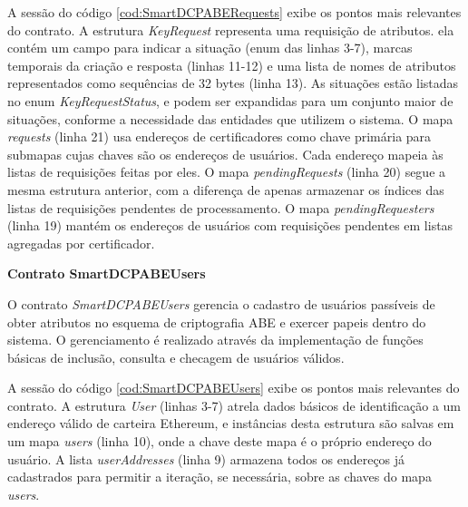 \documentclass[a4paper,11pt]{article}
\begin{document}

A sessão do código \ref{cod:SmartDCPABERequests} exibe os pontos mais relevantes do contrato.
A estrutura \emph{KeyRequest} representa uma requisição de atributos. ela contém um campo para indicar a situação (enum das linhas 3-7), marcas temporais da criação e resposta (linhas 11-12) e uma lista de nomes de atributos representados como sequências de 32 bytes (linha 13).
As situações estão listadas no enum \emph{KeyRequestStatus}, e podem ser expandidas para um conjunto maior de situações, conforme a necessidade das entidades que utilizem o sistema.
O mapa \emph{requests} (linha 21) usa endereços de certificadores como chave primária para submapas cujas chaves são os endereços de usuários. Cada endereço mapeia às listas de requisições feitas por eles.
O mapa \emph{pendingRequests} (linha 20) segue a mesma estrutura anterior, com a diferença de apenas armazenar os índices das listas de requisições pendentes de processamento.
O mapa \emph{pendingRequesters} (linha 19) mantém os endereços de usuários com requisições pendentes em listas agregadas por certificador. %

\textbf{Contrato SmartDCPABEUsers}



O contrato \emph{SmartDCPABEUsers} gerencia o cadastro de usuários passíveis de obter atributos no esquema de criptografia ABE e exercer papeis dentro do sistema.
O gerenciamento é realizado através da implementação de funções básicas de inclusão, consulta e checagem de usuários válidos.

A sessão do código \ref{cod:SmartDCPABEUsers} exibe os pontos mais relevantes do contrato. A estrutura \emph{User} (linhas 3-7) atrela dados básicos de identificação a um endereço válido de carteira Ethereum, e instâncias desta estrutura são salvas em um mapa \emph{users} (linha 10), onde a chave deste mapa é o próprio endereço do usuário.
A lista \emph{userAddresses} (linha 9) armazena todos os endereços já cadastrados para permitir a iteração, se necessária, sobre as chaves do mapa \emph{users}.
\end{document}
